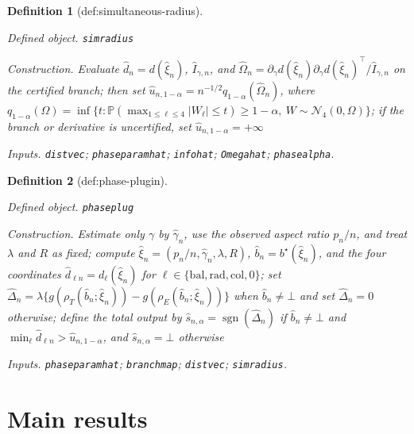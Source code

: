 \documentclass{article}
\newtheorem{definition}{Definition}
\begin{document}
\begin{definition}[def:simultaneous-radius]\label{def:simultaneous-radius}
\par\smallskip\noindent\emph{Defined object.} \texttt{simradius}
\par\smallskip\noindent\emph{Construction.} Evaluate \(\widehat d_n=d(\widehat\xi_n)\), \(\widehat I_{\gamma,n}\), and \(\widehat\Omega_n=\partial_\gamma d(\widehat\xi_n)\partial_\gamma d(\widehat\xi_n)^\top/\widehat I_{\gamma,n}\) on the certified branch; then set \(\widehat u_{n,1-\alpha}=n^{-1/2}q_{1-\alpha}(\widehat\Omega_n)\), where \(q_{1-\alpha}(\Omega)=\inf\{t:\mathbb P(\max_{1\le\ell\le4}|W_\ell|\le t)\ge1-\alpha,\ W\sim\mathcal N_4(0,\Omega)\}\); if the branch or derivative is uncertified, set \(\widehat u_{n,1-\alpha}=+\infty\)
\par\smallskip\noindent\emph{Inputs.} \texttt{distvec}; \texttt{phaseparamhat}; \texttt{infohat}; \texttt{Omegahat}; \texttt{phasealpha}.
\end{definition}

\begin{definition}[def:phase-plugin]\label{def:phase-plugin}
\par\smallskip\noindent\emph{Defined object.} \texttt{phaseplug}
\par\smallskip\noindent\emph{Construction.} Estimate only \(\gamma\) by \(\widehat\gamma_n\), use the observed aspect ratio \(p_n/n\), and treat \(\lambda\) and \(R\) as fixed; compute \(\widehat\xi_n=(p_n/n,\widehat\gamma_n,\lambda,R)\), \(\widehat b_n=b^\star(\widehat\xi_n)\), and the four coordinates \(\widehat d_{\ell n}=d_\ell(\widehat\xi_n)\) for \(\ell\in\{\mathrm{bal},\mathrm{rad},\mathrm{col},0\}\); set \(\widehat\Delta_n=\lambda\{g(\rho_T(\widehat b_n;\widehat\xi_n))-g(\rho_E(\widehat b_n;\widehat\xi_n))\}\) when \(\widehat b_n\ne\bot\) and set \(\widehat\Delta_n=0\) otherwise; define the total output by \(\widehat s_{n,\alpha}=\operatorname{sgn}(\widehat\Delta_n)\) if \(\widehat b_n\ne\bot\) and \(\min_\ell\widehat d_{\ell n}>\widehat u_{n,1-\alpha}\), and \(\widehat s_{n,\alpha}=\bot\) otherwise
\par\smallskip\noindent\emph{Inputs.} \texttt{phaseparamhat}; \texttt{branchmap}; \texttt{distvec}; \texttt{simradius}.
\end{definition}

\section{Main results}
\end{document}
